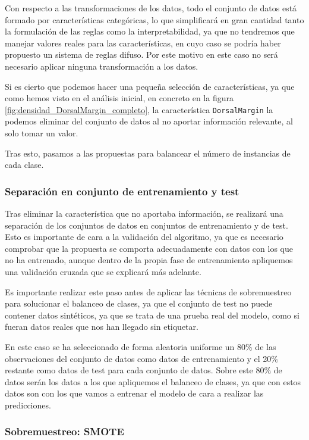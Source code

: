 Con respecto a las transformaciones de los datos, todo el conjunto de datos está formado por características categóricas, lo que simplificará en gran cantidad tanto la formulación de las reglas como la interpretabilidad, ya que no tendremos que manejar valores reales para las características, en cuyo caso se podría haber propuesto un sistema de reglas difuso. Por este motivo en este caso no será necesario aplicar ninguna transformación a los datos.

Si es cierto que podemos hacer una pequeña selección de características, ya que como hemos visto en el análisis inicial, en concreto en la figura \ref{fig:densidad_DorsalMargin_completo}, la característica \texttt{DorsalMargin} la podemos eliminar del conjunto de datos al no aportar información relevante, al solo tomar un valor.

Tras esto, pasamos a las propuestas para balancear el número de instancias de cada clase.

\subsubsection{Separación en conjunto de entrenamiento y test}

Tras eliminar la característica que no aportaba información, se realizará una separación de los conjuntos de datos en conjuntos de entrenamiento y de test. Esto es importante de cara a la validación del algoritmo, ya que es necesario comprobar que la propuesta se comporta adecuadamente con datos con los que no ha entrenado, aunque dentro de la propia fase de entrenamiento apliquemos una validación cruzada que se explicará más adelante.

Es importante realizar este paso antes de aplicar las técnicas de sobremuestreo para solucionar el balanceo de clases, ya que el conjunto de test no puede contener datos sintéticos, ya que se trata de una prueba real del modelo, como si fueran datos reales que nos han llegado sin etiquetar.

En este caso se ha seleccionado de forma aleatoria uniforme un 80\% de las observaciones del conjunto de datos como datos de entrenamiento y el 20\% restante como datos de test para cada conjunto de datos. Sobre este 80\% de datos serán los datos a los que apliquemos el balanceo de clases, ya que con estos datos son con los que vamos a entrenar el modelo de cara a realizar las predicciones.

\newpage

\subsubsection{Sobremuestreo: SMOTE}

